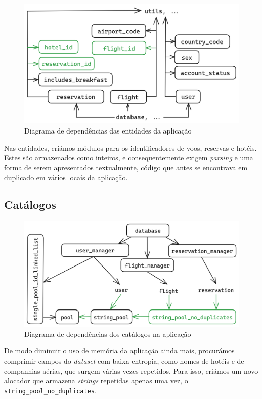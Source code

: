\documentclass[12pt, a4paper]{article}
\begin{document}
\begin{figure}[ht]
    \centering
    \includegraphics[scale=0.2]{res-fase2/entities.png}
    \caption{Diagrama de dependências das entidades da aplicação}
    \label{fig:parsing}
\end{figure}

Nas entidades, criámos módulos para os identificadores de voos, reservas e hotéis. Estes são
armazenados como inteiros, e consequentemente exigem \emph{parsing} e uma forma de serem
apresentados textualmente, código que antes se encontrava em duplicado em vários locais da
aplicação.

\subsection{Catálogos}
\label{sec:catalogs}

\begin{figure}[ht]
    \centering
    \includegraphics[scale=0.17]{res-fase2/database.png}
    \caption{Diagrama de dependências dos catálogos na aplicação}
    \label{fig:catalogs}
\end{figure}

De modo diminuir o uso de memória da aplicação ainda mais, procurámos comprimir campos do
\emph{dataset} com baixa entropia, como nomes de hotéis e de companhias aérias, que surgem várias
vezes repetidos. Para isso, criámos um novo alocador que armazena \emph{strings} repetidas apenas
uma vez, o \texttt{string\_pool\_no\_duplicates}.
\end{document}
